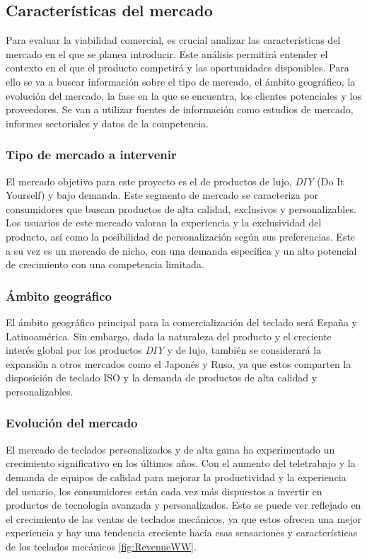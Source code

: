 \subsection{Características del mercado}

Para evaluar la viabilidad comercial, es crucial analizar las características del mercado en el que se planea introducir. Este análisis permitirá entender el contexto en el que el producto competirá y las oportunidades disponibles. Para ello se va a buscar información sobre el tipo de mercado, el ámbito geográfico, la evolución del mercado, la fase en la que se encuentra, los clientes potenciales y los proveedores. Se van a utilizar fuentes de información como estudios de mercado, informes sectoriales y datos de la competencia. \cite{Comercial1} \cite{Comercial2} \cite{Comercial3}

\subsubsection{Tipo de mercado a intervenir}

El mercado objetivo para este proyecto es el de productos de lujo, \textit{DIY} (Do It Yourself) y bajo demanda. Este segmento de mercado se caracteriza por consumidores que buscan productos de alta calidad, exclusivos y personalizables. Los usuarios de este mercado valoran la experiencia y la exclusividad del producto, así como la posibilidad de personalización según sus preferencias. Este a su vez es un mercado de nicho, con una demanda específica y un alto potencial de crecimiento con una competencia limitada.

\subsubsection{Ámbito geográfico}

El ámbito geográfico principal para la comercialización del teclado será España y Latinoamérica. Sin embargo, dada la naturaleza del producto y el creciente interés global por los productos \textit{DIY} y de lujo, también se considerará la expansión a otros mercados como el Japonés y Ruso, ya que estos comparten la disposición de teclado ISO y la demanda de productos de alta calidad y personalizables.

\subsubsection{Evolución del mercado}

El mercado de teclados personalizados y de alta gama ha experimentado un crecimiento significativo en los últimos años. Con el aumento del teletrabajo y la demanda de equipos de calidad para mejorar la productividad y la experiencia del usuario, los consumidores están cada vez más dispuestos a invertir en productos de tecnología avanzada y personalizados. Esto se puede ver reflejado en el crecimiento de las ventas de teclados mecánicos, ya que estos ofrecen una mejor experiencia y hay una tendencia creciente hacia esas sensaciones y características de los teclados mecánicos \ref{fig:RevenueWW}.

